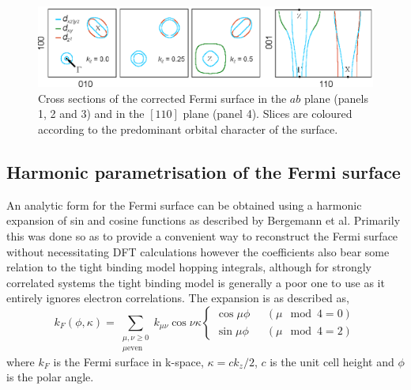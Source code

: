 
\begin{figure}[htbp]
    \begin{center}
        \includegraphics[scale=0.9]{Chapter3-dHvABaFe2P2/Figures/AngleDepMeasurements/ZSlices/ZSlices}
        \caption{Cross sections of the corrected Fermi surface in the $ab$ plane (panels 1, 2 and 3) and in the $[110]$ plane (panel 4). Slices are coloured according to the predominant orbital character of the surface.}
        \label{Fig:3:ZSlices}
    \end{center}
\end{figure}

\clearpage

\subsection{Harmonic parametrisation of the Fermi surface}
    \label{Sec:3:TightBindingFits}

An analytic form for the Fermi surface can be obtained using a harmonic expansion of sin and cosine functions as described by Bergemann et al\cite{Bergemann2000}. Primarily this was done so as to provide a convenient way to reconstruct the Fermi surface without necessitating DFT calculations however the coefficients also bear some relation to the tight binding model hopping integrals, although for strongly correlated systems the tight binding model is generally a poor one to use as it entirely ignores electron correlations. The expansion is as described as,
\begin{equation}
\label{Eqn:3:HarmonicExpansion}
k_F(\phi, \kappa) = \sum_{\substack{\mu,\nu \geq 0 \\ \mu \textrm{even}}}
    k_{\mu\nu}\cos\nu\kappa 
    \begin{cases}
        \cos{\mu\phi} \hspace{8pt} &(\mu\mod4 = 0) \\
        \sin{\mu\phi} \hspace{8pt} &(\mu\mod4 = 2)
    \end{cases}
\end{equation}
where $k_F$ is the Fermi surface in k-space, $\kappa = ck_z/2$, $c$ is the unit cell height and $\phi$ is the polar angle.

